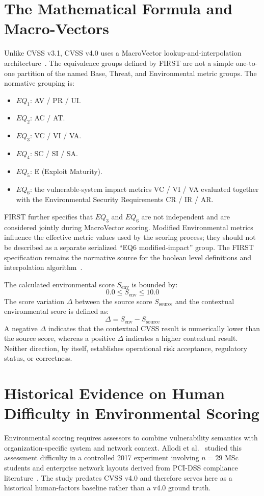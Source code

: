 \section{The Mathematical Formula and Macro-Vectors}
Unlike CVSS v3.1, CVSS v4.0 uses a MacroVector lookup-and-interpolation architecture~\cite{first_cvss_v4}. The equivalence groups defined by FIRST are not a simple one-to-one partition of the named Base, Threat, and Environmental metric groups. The normative grouping is:
\begin{itemize}
    \item $EQ_1$: AV / PR / UI.
    \item $EQ_2$: AC / AT.
    \item $EQ_3$: VC / VI / VA.
    \item $EQ_4$: SC / SI / SA.
    \item $EQ_5$: E (Exploit Maturity).
    \item $EQ_6$: the vulnerable-system impact metrics VC / VI / VA evaluated together with the Environmental Security Requirements CR / IR / AR.
\end{itemize}
FIRST further specifies that $EQ_3$ and $EQ_6$ are not independent and are considered jointly during MacroVector scoring. Modified Environmental metrics influence the effective metric values used by the scoring process; they should not be described as a separate serialized ``EQ6 modified-impact'' group. The FIRST specification remains the normative source for the boolean level definitions and interpolation algorithm~\cite{first_cvss_v4}.

The calculated environmental score $S_{\text{env}}$ is bounded by:
\begin{equation}
    0.0 \le S_{\text{env}} \le 10.0
\end{equation}
The score variation $\Delta$ between the source score $S_{\text{source}}$ and the contextual environmental score is defined as:
\begin{equation}
    \Delta = S_{\text{env}} - S_{\text{source}}
\end{equation}
A negative $\Delta$ indicates that the contextual CVSS result is numerically lower than the source score, whereas a positive $\Delta$ indicates a higher contextual result. Neither direction, by itself, establishes operational risk acceptance, regulatory status, or correctness.

\section{Historical Evidence on Human Difficulty in Environmental Scoring}
\label{sec:human_failure_baseline}
Environmental scoring requires assessors to combine vulnerability semantics with organization-specific system and network context. Allodi et al.~\cite{santos2017estimating} studied this assessment difficulty in a controlled 2017 experiment involving $n=29$ MSc students and enterprise network layouts derived from PCI-DSS compliance literature~\cite{williams2014pci}. The study predates CVSS v4.0 and therefore serves here as a historical human-factors baseline rather than a v4.0 ground truth.


